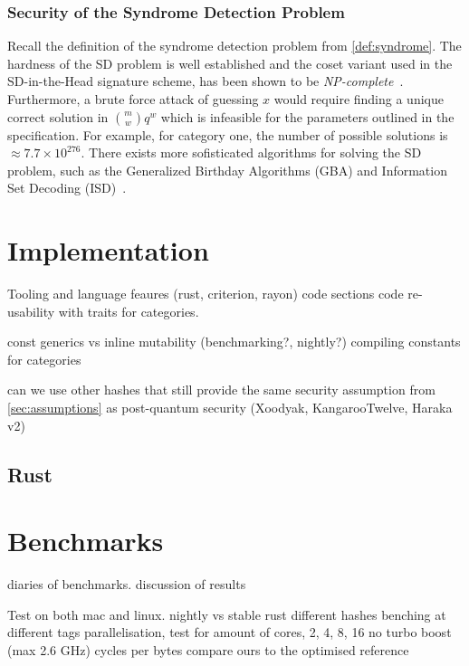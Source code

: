\documentclass[twoside,11pt,openright]{report}
\theoremstyle{definition}
\theoremstyle{plain}
\begin{document}
\subsection{Security of the Syndrome Detection Problem}
\label{sec:sdsec}

Recall the definition of the syndrome detection problem from \autoref{def:syndrome}. The hardness of the SD problem is well established and the coset variant used in the SD-in-the-Head signature scheme, has been shown to be \textit{NP-complete}~\cite{berlekamp1978inherent,aguilarsyndrome11}. Furthermore, a brute force attack of guessing $x$ would require finding a unique correct solution in $\binom{m}{w} q^w$ which is infeasible for the parameters outlined in the specification. For example, for category one, the number of possible solutions is $\approx 7.7 \times 10^{276}$. There exists more sofisticated algorithms for solving the SD problem, such as the Generalized Birthday Algorithms (GBA) and Information Set Decoding (ISD)~\cite{prange1962use}.



\chapter{Implementation}
\label{ch:impl}

Tooling and language feaures (rust, criterion, rayon)
code sections
code re-usability with traits for categories.

const generics vs inline mutability (benchmarking?, nightly?)
compiling constants for categories

can we use other hashes that still provide the same security assumption from \autoref{sec:assumptions} as post-quantum security (Xoodyak, KangarooTwelve, Haraka v2)

\section{Rust}
\cite{nistsaferlanguages}


\chapter{Benchmarks}
\label{ch:bench}
diaries of benchmarks.
discussion of results

Test on both mac and linux.
nightly vs stable rust
different hashes
benching at different tags
parallelisation, test for amount of cores, 2, 4, 8, 16
no turbo boost (max 2.6 GHz)
cycles per bytes
compare ours to the optimised reference
\end{document}
